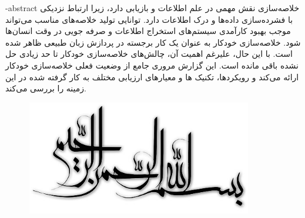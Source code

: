 \department{}

\fa-abstract{
	خلاصه‌سازی نقش مهمی در علم اطلاعات و بازیابی دارد، زیرا ارتباط نزدیکی با فشرده‌سازی داده‌ها و درک اطلاعات دارد. توانایی تولید خلاصه‌های مناسب می‌تواند موجب بهبود کارآمدی سیستم‌های استخراج اطلاعات و صرفه جویی در وقت انسان‌ها شود. خلاصه‌سازی خودکار به عنوان یک کار برجسته در پردازش زبان طبیعی 
	ظاهر شده است. با این حال، علیرغم اهمیت آن، چالش‌های خلاصه‌سازی خودکار تا حد زیادی حل نشده باقی مانده است. این گزارش مروری جامع از وضعیت فعلی خلاصه‌سازی خودکار ارائه می‌کند و رویکردها، تکنیک ها و معیارهای ارزیابی مختلف به کار گرفته شده در این زمینه را بررسی می‌کند.
}





\AUTtitle
\vspace*{7cm}
\thispagestyle{empty}
\begin{center}
\includegraphics[height=5cm,width=12cm]{besm}
\end{center}
